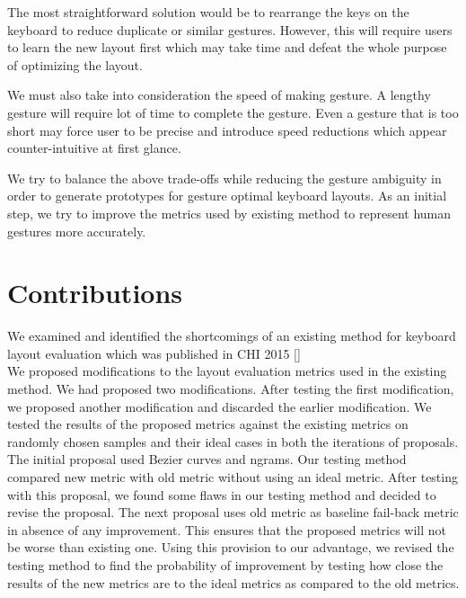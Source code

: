 \documentclass[MTech]{iitmdiss}
\begin{document}
The most straightforward solution would be to rearrange the keys on the keyboard to reduce duplicate or similar gestures. However, this will require users to learn the new layout first which may take time and defeat the whole purpose of optimizing the layout.


We must also take into consideration the speed of making gesture. A lengthy gesture will require lot of time to complete the gesture. Even a gesture that is too short may force user to be precise and introduce speed reductions which appear counter-intuitive at first glance.


We try to balance the above trade-offs while reducing the gesture ambiguity in order to generate prototypes for gesture optimal keyboard layouts. As an initial step, we try to improve the metrics used by existing method to represent human gestures more accurately.

\section{Contributions}
We examined and identified the shortcomings of an existing method for keyboard layout evaluation which was published in CHI 2015 [\cite{gesturerecog}]\\
We proposed modifications to the layout evaluation metrics used in the existing method. We had proposed two modifications. After testing the first modification, we proposed another modification and discarded the earlier modification. We tested the results of the proposed metrics against the existing metrics on randomly chosen samples and their ideal cases in both the iterations of proposals.\\ 
The initial proposal used Bezier curves and ngrams. Our testing method compared new metric with old metric without using an ideal metric. After testing with this proposal, we found some flaws in our testing method and decided to revise the proposal. The next proposal uses old metric as baseline fail-back metric in absence of any improvement. This ensures that the proposed metrics will not be worse than existing one. Using this provision to our advantage, we revised the testing method to find the probability of improvement by testing how close the results of the new metrics are to the ideal metrics as compared to the old metrics.
\end{document}
